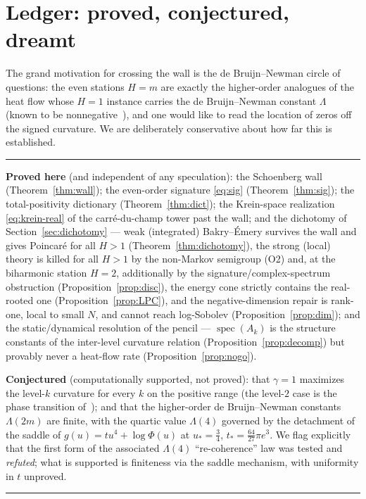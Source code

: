 \documentclass[11pt,reqno]{amsart}
\theoremstyle{plain}
\theoremstyle{definition}
\newenvironment{ledger}
  {\par\medskip\noindent\rule{\linewidth}{0.4pt}\par\nopagebreak\smallskip\small}
  {\par\nopagebreak\smallskip\noindent\rule{\linewidth}{0.4pt}\par\medskip}
\DeclareMathOperator{\spec}{spec}
\begin{document}
\section{Ledger: proved, conjectured, dreamt}\label{sec:ledger}

The grand motivation for crossing the wall is the de Bruijn--Newman circle of
questions: the even stations $H=m$ are exactly the higher-order analogues of the
heat flow whose $H=1$ instance carries the de Bruijn--Newman constant $\Lambda$
(known to be nonnegative~\cite{RodgersTao}), and one would like to read the
location of zeros off the signed curvature. We are
deliberately conservative about how far this is established.

\begin{ledger}
\noindent\textbf{Proved here} (and independent of any speculation):
the Schoenberg wall (Theorem~\ref{thm:wall}); the even-order signature
\eqref{eq:sig} (Theorem~\ref{thm:sig}); the total-positivity dictionary
(Theorem~\ref{thm:dict}); the Krein-space realization \eqref{eq:krein-real} of the
carr\'e-du-champ tower past the wall; and the dichotomy of
Section~\ref{sec:dichotomy} --- weak (integrated) Bakry--\'Emery survives the wall
and gives Poincar\'e for all $H>1$ (Theorem~\ref{thm:dichotomy}), the strong
(local) theory is killed for all $H>1$ by the non-Markov semigroup (O2) and, at
the biharmonic station $H=2$, additionally by the signature/complex-spectrum
obstruction (Proposition~\ref{prop:disc}), the energy cone strictly contains the
real-rooted one (Proposition~\ref{prop:LPC}), and the negative-dimension repair is
rank-one, local to small $N$, and cannot reach log-Sobolev
(Proposition~\ref{prop:dim}); and the static/dynamical resolution of the pencil ---
$\spec(A_k)$ is the structure constants of the inter-level curvature relation
(Proposition~\ref{prop:decomp}) but provably never a heat-flow rate
(Proposition~\ref{prop:nogo}).

\smallskip\noindent\textbf{Conjectured} (computationally supported, not proved):
that $\gamma=1$ maximizes the level-$k$ curvature for every $k$ on the positive
range (the level-$2$ case is the phase transition of~\cite{FontesPartI}); and that
the higher-order de Bruijn--Newman constants $\Lambda(2m)$ are finite, with the
quartic value $\Lambda(4)$ governed by the detachment of the saddle of
$g(u)=tu^{4}+\log\Phi(u)$ at $u_*=\tfrac34$, $t_*=\tfrac{64}{27}\pi e^{3}$. We
flag explicitly that the first form of the associated $\Lambda(4)$
``re-coherence'' law was tested and \emph{refuted}; what is supported is finiteness
via the saddle mechanism, with uniformity in $t$ unproved.


\end{ledger}
\end{document}

